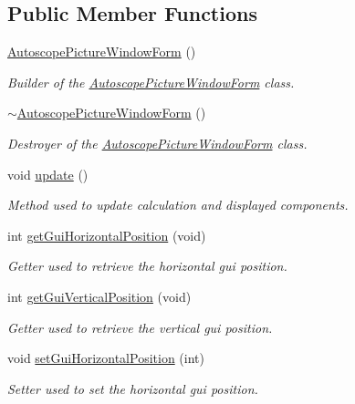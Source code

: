 \subsection*{Public Member Functions}
\begin{DoxyCompactItemize}
\item 
\hyperlink{class_autoscope_picture_window_form_ac7e1f8a94457cce24469119ea3214f8a}{Autoscope\+Picture\+Window\+Form} ()
\begin{DoxyCompactList}\small\item\em Builder of the \hyperlink{class_autoscope_picture_window_form}{Autoscope\+Picture\+Window\+Form} class. \end{DoxyCompactList}\item 
\hyperlink{class_autoscope_picture_window_form_a0ac8bae5bd9b170aea179812f0f516be}{$\sim$\+Autoscope\+Picture\+Window\+Form} ()
\begin{DoxyCompactList}\small\item\em Destroyer of the \hyperlink{class_autoscope_picture_window_form}{Autoscope\+Picture\+Window\+Form} class. \end{DoxyCompactList}\item 
void \hyperlink{class_autoscope_picture_window_form_a84ad64e4121c67a3269f935e50cfee2c}{update} ()
\begin{DoxyCompactList}\small\item\em Method used to update calculation and displayed components. \end{DoxyCompactList}\item 
int \hyperlink{class_autoscope_picture_window_form_ad9fa74865956b50029f0e2692ab256c8}{get\+Gui\+Horizontal\+Position} (void)
\begin{DoxyCompactList}\small\item\em Getter used to retrieve the horizontal gui position. \end{DoxyCompactList}\item 
int \hyperlink{class_autoscope_picture_window_form_ad7eeabfc680448ec5f663f7c68f6e3f4}{get\+Gui\+Vertical\+Position} (void)
\begin{DoxyCompactList}\small\item\em Getter used to retrieve the vertical gui position. \end{DoxyCompactList}\item 
void \hyperlink{class_autoscope_picture_window_form_a1a3b45dad146565be0f597e1b11cb910}{set\+Gui\+Horizontal\+Position} (int)
\begin{DoxyCompactList}\small\item\em Setter used to set the horizontal gui position. \end{DoxyCompactList}\item 

\end{DoxyCompactItemize}
